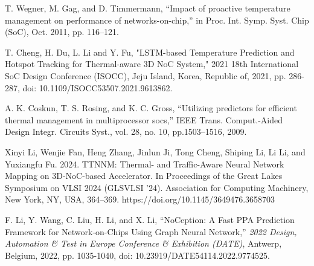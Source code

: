 \documentclass[conference]{IEEEtran}
\begin{document}
\begin{thebibliography}{00}
T. Wegner, M. Gag, and D. Timmermann, “Impact of proactive temperature management on performance of networks-on-chip,” in Proc.
Int. Symp. Syst. Chip (SoC), Oct. 2011, pp. 116–121.

T. Cheng, H. Du, L. Li and Y. Fu, "LSTM-based Temperature Prediction and Hotspot Tracking for Thermal-aware 3D NoC System," 2021 18th International SoC Design Conference (ISOCC), Jeju Island, Korea, Republic of, 2021, pp. 286-287, doi: 10.1109/ISOCC53507.2021.9613862.

A. K. Coskun, T. S. Rosing, and K. C. Gross, “Utilizing predictors for efficient thermal management in multiprocessor socs,” IEEE
Trans. Comput.-Aided Design Integr. Circuits Syst., vol. 28, no. 10, pp.1503–1516, 2009.

Xinyi Li, Wenjie Fan, Heng Zhang, Jinlun Ji, Tong Cheng, Shiping Li, Li Li, and Yuxiangfu Fu. 2024. TTNNM: Thermal- and Traffic-Aware Neural Network Mapping on 3D-NoC-based Accelerator. In Proceedings of the Great Lakes Symposium on VLSI 2024 (GLSVLSI '24). Association for Computing Machinery, New York, NY, USA, 364–369. https://doi.org/10.1145/3649476.3658703

F. Li, Y. Wang, C. Liu, H. Li, and X. Li, ``NoCeption: A Fast PPA Prediction Framework for Network-on-Chips Using Graph Neural Network,'' \emph{2022 Design, Automation \& Test in Europe Conference \& Exhibition (DATE)}, Antwerp, Belgium, 2022, pp. 1035-1040, doi: 10.23919/DATE54114.2022.9774525.



\end{thebibliography}
\end{document}
